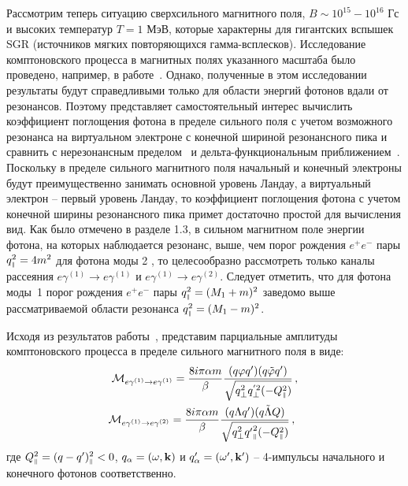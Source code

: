 Рассмотрим теперь ситуацию сверхсильного магнитного поля, \linebreak\mbox{$B\sim 10^{15}-10^{16}$} Гс и высоких температур $T=1$ МэВ, которые характерны для гигантских вспышек SGR (источников мягких повторяющихся гамма-всплесков).  Исследование комптоновского процесса в магнитных полях указанного масштаба было проведено, например, в работе~\cite{Chistyakov:2009}. Однако, полученные в этом исследовании результаты будут справедливыми только для области энергий фотонов вдали от резонансов. Поэтому представляет самостоятельный интерес вычислить коэффициент поглощения фотона в пределе сильного поля с учетом возможного резонанса на виртуальном электроне с конечной шириной резонансного пика и сравнить с нерезонансным пределом~\cite{Chistyakov:2009} и дельта-функциональным приближением~\cite{Rumyantsev:2017}. Поскольку в пределе сильного магнитного поля начальный и конечный электроны будут преимущественно занимать основной уровень Ландау, а виртуальный электрон -- первый уровень Ландау, то коэффициент поглощения фотона с учетом конечной ширины резонансного пика примет достаточно простой для вычисления вид. Как было отмечено в разделе 1.3, в сильном магнитном поле энергии фотона, на которых наблюдается резонанс, выше, чем порог рождения $e^+e^-$ пары $q_{\mbox{\tiny $\|$}}^2=4m^2$ для фотона моды 2 , то целесообразно рассмотреть только каналы рассеяния $e\gamma^{(1)}\to e\gamma^{(1)}$ и $e\gamma^{(1)}\to e\gamma^{(2)}$. Следует отметить, что для фотона моды~1 порог рождения $e^+e^-$ пары $q_{\mbox{\tiny $\|$}}^2=(M_1+m)^2$ заведомо выше рассматриваемой области резонанса $q_{\mbox{\tiny $\|$}}^2=(M_1-m)^2$.

Исходя из результатов работы~\cite{Chistyakov:2009}, представим парциальные амплитуды комптоновского процесса в пределе сильного магнитного поля в виде:
\begin{equation}\begin{gathered}\label{amplnonres}
		{\cal M}_{e\gamma^{(1)}\to e\gamma^{(1)}}=\frac{8i\pi\alpha m}{\beta}\frac{(q\varphi q')(q\tilde{\varphi}q')}{\sqrt{q^2_\perp q^{'2}_\perp (-Q^2_{\mbox{\tiny $\|$}})}}\, ,\\
		{\cal M}_{e\gamma^{(1)}\to e\gamma^{(2)}}=\frac{8i \pi\alpha m}{\beta}\frac{(q\Lambda q')(q\tilde{\Lambda} Q)}{\sqrt{q^2_\perp {q'}^2_{\mbox{\tiny $\|$}}(-Q^2_{\mbox{\tiny $\|$}})}}\, ,\hspace{2mm} 
\end{gathered}\end{equation}
где   
$Q^2_{\mbox{\tiny $\|$}} = (q - q')^2_{\mbox{\tiny $\|$}} <0$,
$q_{\alpha} = (\omega,{\bf k})$ и $q'_{\alpha} = (\omega',{\bf k'})$
-- 4-импульсы начального и конечного фотонов соответственно.

